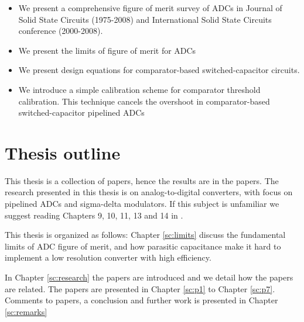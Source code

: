 \begin{itemize}

\item We present a comprehensive figure of merit survey of ADCs in Journal of Solid State
  Circuits (1975-2008) and
  International Solid State Circuits conference (2000-2008).
\item We present the  limits of figure of merit for ADCs
\item We present design equations for comparator-based
  switched-capacitor circuits.
\item We introduce a simple calibration scheme for comparator threshold
  calibration. This technique cancels the overshoot in
  comparator-based switched-capacitor pipelined ADCs

\end{itemize}






\section{Thesis outline}
This thesis is a collection of papers, hence the 
results are in the papers. The research presented in this thesis is on analog-to-digital
converters, with focus on pipelined ADCs and sigma-delta modulators. If this subject is unfamiliar we suggest reading 
Chapters 9, 10, 11, 13 and 14  in \cite{johns}. 


This thesis is organized as follows: Chapter \ref{sc:limits} discuss
the fundamental limits of ADC figure of merit, and how parasitic
capacitance make it hard to implement a low resolution converter with
high efficiency.

In Chapter \ref{sc:research} the papers are introduced and we detail how the papers are related. 
The papers are presented in Chapter \ref{sc:p1} to Chapter
\ref{sc:p7}. Comments to papers, a conclusion and further work is
presented in Chapter \ref{sc:remarks}



